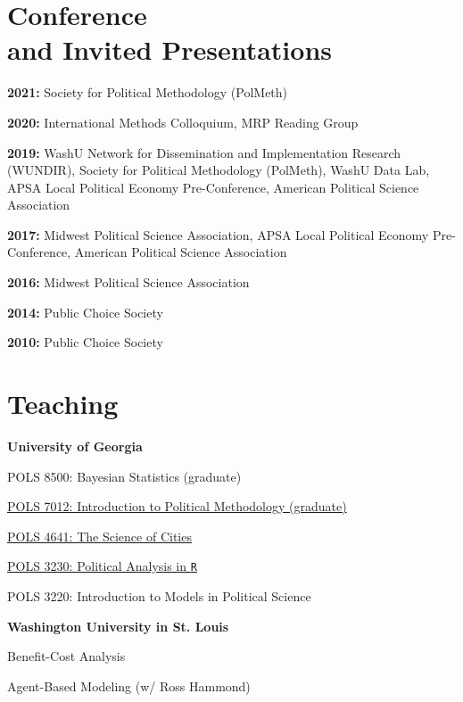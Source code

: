 \documentclass[margin,line]{res}
\newenvironment{list1}{
  \begin{list}{}{%
      \setlength{\itemsep}{0.1in}
      \setlength{\parsep}{0in} \setlength{\parskip}{0in}
      \setlength{\topsep}{0.1in} \setlength{\partopsep}{0in} 
      \setlength{\leftmargin}{0.17in}}}{\end{list}}
\begin{document}
\begin{resume}
\section{\sc Conference \\and Invited Presentations}

\textbf{2021:} Society for Political Methodology (PolMeth)

\textbf{2020:} International Methods Colloquium, MRP Reading Group

\textbf{2019:} WashU Network for Dissemination and Implementation Research (WUNDIR), Society for Political Methodology (PolMeth), WashU Data Lab, APSA Local Political Economy Pre-Conference, American Political Science Association

\textbf{2017:} Midwest Political Science Association, APSA Local Political Economy Pre-Conference, American Political Science Association

\textbf{2016:} Midwest Political Science Association

\textbf{2014:} Public Choice Society

\textbf{2010:} Public Choice Society


\section{\sc Teaching}


\textbf{University of Georgia}
\begin{list1}
	\item[] POLS 8500: Bayesian Statistics (graduate)
	\item[] \href{https://joeornstein.github.io/pols-7012//}{POLS 7012: Introduction to Political Methodology (graduate)}
	\item[] \href{https://joeornstein.github.io/pols-4641/}{POLS 4641: The Science of Cities}
	\item[] \href{https://joeornstein.github.io/pols-3230/}{POLS 3230: Political Analysis in \texttt{R}}
	\item[] POLS 3220: Introduction to Models in Political Science
\end{list1}

\textbf{Washington University in St. Louis}
\begin{list1}
	\item[] Benefit-Cost Analysis
	\item[] Agent-Based Modeling (w/ Ross Hammond)
\end{list1}


\end{resume}
\end{document}
